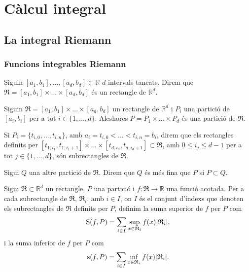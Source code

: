 \documentclass[../Apunts.tex]{subfiles}
\begin{document}
\chapter{Càlcul integral}
	\section{La integral Riemann}
	\subsection{Funcions integrables Riemann}
	\begin{definition}[Rectangle]
		\label{def:Rectangle}
		Siguin \([a_{1},b_{1}],\dots,[a_{d},b_{d}]\subset\mathbb{R}\) \(d\) intervals tancats. Direm que \(\mathfrak{R}=[a_{1},b_{1}]\times\dots\times[a_{d},b_{d}]\) és un rectangle de \(\mathbb{R}^{d}\).
	\end{definition}
	\begin{definition}
		\label{def:Partició d'un rectangle}
		\label{def:finor d'una partició}
		Siguin \(\mathfrak{R}=[a_{1},b_{1}]\times\dots\times[a_{d},b_{d}]\) un rectangle de \(\mathbb{R}^{d}\) i \(P_{i}\) una partició de \([a_{i},b_{i}]\) per a tot \(i\in\{1,\dots,d\}\). Aleshores \(P=P_{1}\times\dots\times P_{d}\) és una partició de \(\mathfrak{R}\).
		
		Si \(P_{i}=\{t_{i,0},\dots,t_{i,n}\}\), amb \(a_{i}=t_{i,0}<\dots<t_{i,n}=b_{i}\), direm que els rectangles definits per \([t_{1,i_{1}},t_{1,i_{1}+1}]\times\dots\times[t_{d,i_{d}},t_{d,i_{d}+1}]\subset \mathfrak{R}\), amb \(0\leq i_{j}\leq d-1\) per a tot \(j\in\{1,\dots,d\}\), són subrectangles de \(\mathfrak{R}\).
		
		Sigui \(Q\) una altre partició de \(\mathfrak{R}\). Direm que \(Q\) és més fina que \(P\) si \(P\subset Q\).
	\end{definition}
	\begin{definition}
		\label{def:Suma superior i inferior}
		Sigui \(\mathfrak{R}\subset\mathbb{R}^{d}\) un rectangle, \(P\) una partició i \(f\colon\mathfrak{R}\to\mathbb{R}\) una funció acotada. Per a cada subrectangle de \(\mathfrak{R}\), \(\mathfrak{R}_{i}\), amb \(i\in I\), on \(I\) és el conjunt d'índexs que denoten els subrectangles de \(\mathfrak{R}\) definits per \(P\), definim la suma superior de \(f\) per \(P\) com
		\[\Ssup(f,P)=\sum_{i\in I}\sup_{x\in \mathfrak{R}_{i}}f(x)\abs{\mathfrak{R}_{i}},\]
		i la suma inferior de \(f\) per \(P\) com
		\[\sinf(f,P)=\sum_{i\in I}\inf_{x\in \mathfrak{R}_{i}}f(x)\abs{\mathfrak{R}_{i}}.\]
	\end{definition}
\end{document}
